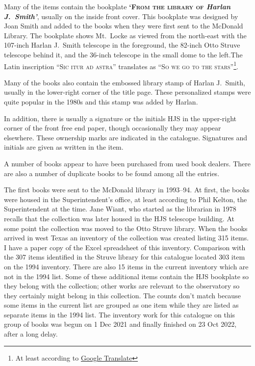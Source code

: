 Many of the items contain the bookplate {\bfseries\textsc{`From the
    library of} \textit{Harlan J.~Smith'}}, usually on the inside
front cover. This bookplate was designed by Joan Smith and added to
the books when they were first sent to the McDonald Library. The
bookplate shows Mt.~Locke as viewed from the north-east with the
107-inch Harlan J.~Smith telescope in the foreground, the 82-inch Otto
Struve telescope behind it, and the 36-inch telescope in the small
dome to the left.The Latin inscription \textsc{``Sic itur ad astra''}
translates as \textsc{``So we go to the stars''}\footnote{At least
according to \href{https://translate.google.com}{Google Translate}}.

Many of the books also contain the embossed library stamp of Harlan
J.~Smith, usually in the lower-right corner of the title page. These
personalized stamps were quite popular in the 1980s and this stamp was
added by Harlan.

In addition, there is usually a signature or the initials
HJS in the upper-right corner of the front free end paper, though
occasionally they may appear elsewhere.  These ownership marks are
indicated in the catalogue.  Signatures and initials are given as
written in the item.

A number of books appear to have been purchased from used book
dealers.  There are also a number of duplicate books to be found among
all the entries.

The first books were sent to the McDonald library in 1993--94. At
first, the books were housed in the Superintendent's office, at least
according to Phil Kelton, the Superintendent at the time.  Jane Wiant,
who started as the librarian in 1978 recalls that the collection was
later housed in the HJS telescope building.  At some point the
collection was moved to the Otto Struve library.  When the books
arrived in west Texas an inventory of the collection was created
listing 315 items. I have a paper copy of the Excel spreadsheet of
this inventory.  Comparison with the 307 items identified in the
Struve library for this catalogue located 303 item on the 1994
inventory. There are also 15 items in the current inventory which are
not in the 1994 list. Some of these additional items contain the HJS
bookplate so they belong with the collection; other works are relevant
to the observatory so they certainly might belong in this
collection. The counts don't match because some items in the current
list are grouped as one item while they are listed as separate items
in the 1994 list.  The inventory work for this catalogue on this group
of books was begun on 1 Dec 2021 and finally finished on 23 Oct 2022,
after a long delay.

